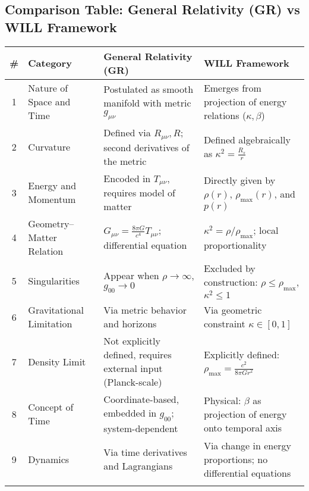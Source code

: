 \documentclass[12pt, a4paper]{article}
\begin{document}
\subsection*{Comparison Table: General Relativity (GR) vs WILL Framework}

\begin{tabularx}{\textwidth}{@{}clXX@{}}
\toprule
\# & Category & \textbf{General Relativity (GR)} & \textbf{WILL Framework} \\
\midrule
1 & Nature of Space and Time & 
Postulated as smooth manifold with metric \( g_{\mu\nu} \) & 
Emerges from projection of energy relations (\( \kappa, \beta \)) \\
\addlinespace

2 & Curvature & 
Defined via \( R_{\mu\nu}, R \); second derivatives of the metric & 
Defined algebraically as \( \kappa^2 = \frac{R_s}{r} \) \\
\addlinespace

3 & Energy and Momentum & 
Encoded in \( T_{\mu\nu} \), requires model of matter & 
Directly given by \( \rho(r) \), \( \rho_{\text{max}}(r) \), and \( p(r) \) \\
\addlinespace

4 & Geometry–Matter Relation & 
\( G_{\mu\nu} = \frac{8\pi G}{c^4} T_{\mu\nu} \); differential equation & 
\( \kappa^2 = \rho / \rho_{\text{max}} \); local proportionality \\
\addlinespace

5 & Singularities & 
Appear when \( \rho \to \infty \), \( g_{00} \to 0 \) & 
Excluded by construction: \( \rho \leq \rho_{\text{max}} \), \( \kappa^2 \leq 1 \) \\
\addlinespace

6 & Gravitational Limitation & 
Via metric behavior and horizons & 
Via geometric constraint \( \kappa \in [0,1] \) \\
\addlinespace

7 & Density Limit & 
Not explicitly defined, requires external input (Planck-scale) & 
Explicitly defined: \( \rho_{\text{max}} = \frac{c^2}{8\pi G r^2} \) \\
\addlinespace

8 & Concept of Time & 
Coordinate-based, embedded in \( g_{00} \); system-dependent & 
Physical: \( \beta \) as projection of energy onto temporal axis \\
\addlinespace

9 & Dynamics & 
Via time derivatives and Lagrangians & 
Via change in energy proportions; no differential equations \\
\addlinespace


\end{tabularx}
\end{document}
